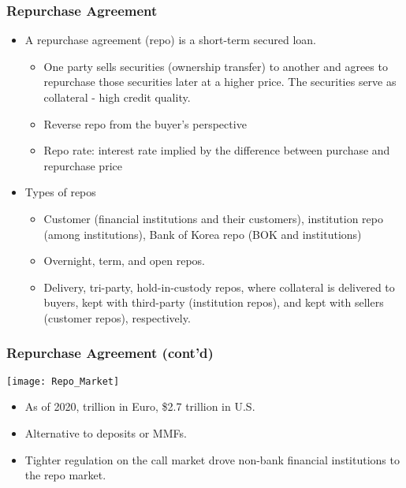 \documentclass[10pt]{beamer}
\begin{document}
	\begin{frame}
		\frametitle{Repurchase Agreement}
		
		\begin{itemize}  \vspace{5pt} \itemsep10pt
			\item A repurchase agreement (repo) is a short-term secured loan.
			
			\begin{itemize}  \vspace{5pt} \itemsep10pt
				\item One party sells securities (ownership transfer) to another and agrees to repurchase those securities later at a higher price. The securities serve as collateral - high credit quality.
				\item Reverse repo from the buyer's perspective
				\item Repo rate: interest rate implied by the difference between purchase and repurchase price 
			\end{itemize}
			
			\item Types of repos
			\begin{itemize}  \vspace{5pt} \itemsep10pt
				\item Customer (financial institutions and their customers), institution repo (among institutions), Bank of Korea repo (BOK and institutions)
				\item Overnight, term, and open repos.
				\item Delivery, tri-party, hold-in-custody repos, where collateral is delivered to buyers, kept with third-party (institution repos), and kept with sellers (customer repos), respectively.
			\end{itemize}		
			
			
		\end{itemize}
		
	\end{frame}
	
	
	
	\begin{frame}
		\frametitle{Repurchase Agreement (cont'd)} %
		\begin{center}
			\texttt{[image: Repo\_Market]}
			{\scriptsize 
				\begin{itemize}
					\item As of 2020,  trillion in Euro, \$2.7 trillion in U.S.
					\item Alternative to deposits or MMFs.
					\item Tighter regulation on the call market drove non-bank financial institutions to the repo market.
				\end{itemize}
			}		
		\end{center}
		
	\end{frame}
	
\end{document}
